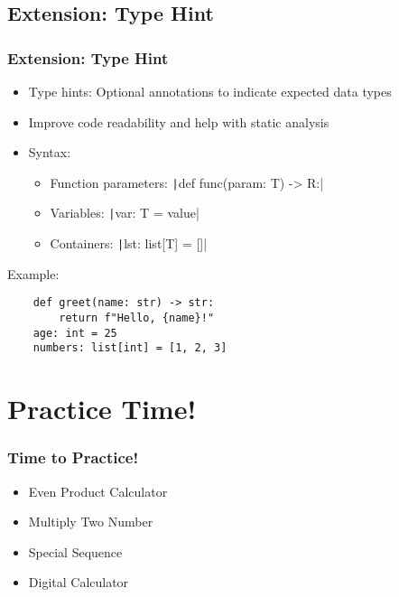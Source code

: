 \documentclass{beamer}
\newcommand{\python}[1]{\texttt|#1|}
\begin{document}
\subsection{Extension: Type Hint}
\begin{frame}[fragile]
    \frametitle{Extension: Type Hint}
    \begin{itemize}
        \item Type hints: Optional annotations to indicate expected data types
        \item Improve code readability and help with static analysis
        \item Syntax:
              \begin{itemize}
                  \item Function parameters: \python{def func(param: T) -> R:}
                  \item Variables: \python{var: T = value}
                  \item Containers: \python{lst: list[T] = []}
              \end{itemize}
    \end{itemize}
    Example:
    \begin{verbatim}
    def greet(name: str) -> str:
        return f"Hello, {name}!"
    age: int = 25
    numbers: list[int] = [1, 2, 3]
    \end{verbatim}
\end{frame}

\section{Practice Time!}
\begin{frame}
    \frametitle{Time to Practice!}
    \begin{itemize}
        \item Even Product Calculator
        \item Multiply Two Number
        \item Special Sequence
        \item Digital Calculator
    \end{itemize}
\end{frame}
\end{document}
